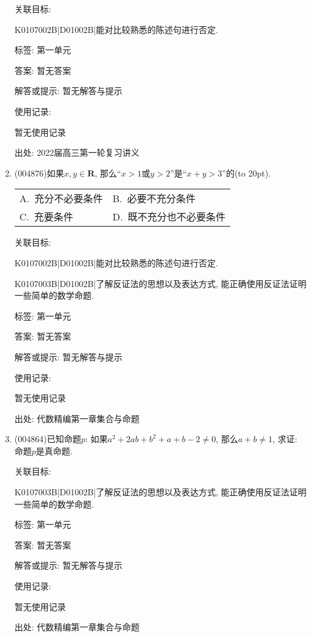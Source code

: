 \documentclass[10pt,a4paper]{article}
\newcommand{\bracket}[1]{(\hbox to #1pt{})}
\newcommand{\twoch}[4]{\par\begin{tabular}{p{.46\textwidth}p{.46\textwidth}}
A.~#1& B.~#2\\
C.~#3& D.~#4
\end{tabular}}
\begin{document}
\begin{enumerate}[1.]
关联目标:

K0107002B|D01002B|能对比较熟悉的陈述句进行否定.



标签: 第一单元

答案: 暂无答案

解答或提示: 暂无解答与提示

使用记录:

暂无使用记录


出处: 2022届高三第一轮复习讲义
\item { (004876)}如果$x,y\in \mathbf{R}$, 那么``$x>1$或$y>2$''是``$x+y>3$''的\bracket{20}.
\twoch{充分不必要条件}{必要不充分条件}{充要条件}{既不充分也不必要条件}


关联目标:

K0107002B|D01002B|能对比较熟悉的陈述句进行否定.

K0107003B|D01002B|了解反证法的思想以及表达方式, 能正确使用反证法证明一些简单的数学命题.



标签: 第一单元

答案: 暂无答案

解答或提示: 暂无解答与提示

使用记录:

暂无使用记录


出处: 代数精编第一章集合与命题
\item { (004864)}已知命题$p$: 如果$a^2+2ab+b^2+a+b-2\ne 0$, 那么$a+b\ne 1$, 求证: 命题$p$是真命题.


关联目标:

K0107003B|D01002B|了解反证法的思想以及表达方式, 能正确使用反证法证明一些简单的数学命题.



标签: 第一单元

答案: 暂无答案

解答或提示: 暂无解答与提示

使用记录:

暂无使用记录


出处: 代数精编第一章集合与命题
\end{enumerate}
\end{document}
